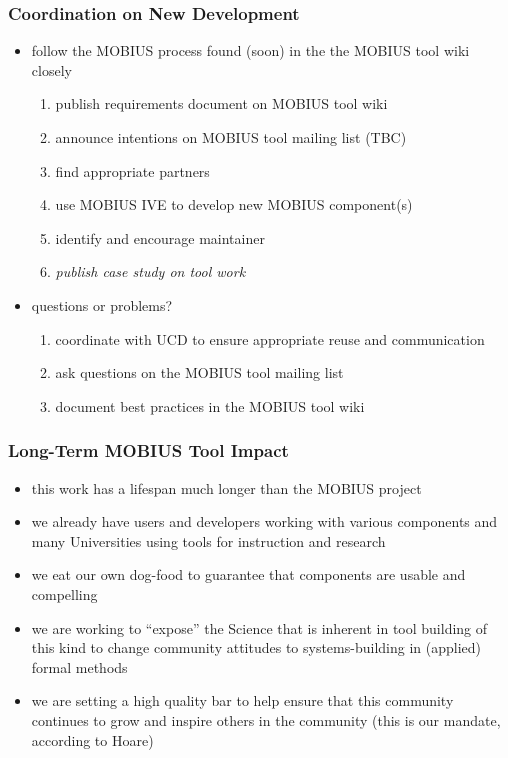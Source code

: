 \documentclass{beamer}
\begin{document}
\begin{frame}\frametitle{Coordination on New Development}
  \begin{itemize}
  \item follow the MOBIUS process found (soon) in the the MOBIUS tool
    wiki closely
    \begin{enumerate}
    \item publish requirements document on MOBIUS tool wiki
    \item announce intentions on MOBIUS tool mailing list (TBC)
    \item find appropriate partners
    \item use MOBIUS IVE to develop new MOBIUS component(s)
    \item identify and encourage maintainer
    \item \emph{publish case study on tool work}
    \end{enumerate}
  \item questions or problems?
    \begin{enumerate}
    \item coordinate with UCD to ensure appropriate reuse and
      communication
    \item ask questions on the MOBIUS tool mailing list
    \item document best practices in the MOBIUS tool wiki
    \end{enumerate}
  \end{itemize}
\end{frame}

\begin{frame}\frametitle{Long-Term MOBIUS Tool Impact}
  \begin{itemize}
  \item this work has a lifespan much longer than the MOBIUS project
  \item we already have users and developers working with various
    components and many Universities using tools for instruction and
    research
  \item we eat our own dog-food to guarantee that components are
    usable and compelling
  \item we are working to ``expose'' the Science that is inherent in
    tool building of this kind to change community attitudes to
    systems-building in (applied) formal methods
  \item we are setting a high quality bar to help ensure that this
    community continues to grow and inspire others in the community
    (this is our mandate, according to Hoare)
  \end{itemize}
\end{frame}
\end{document}
